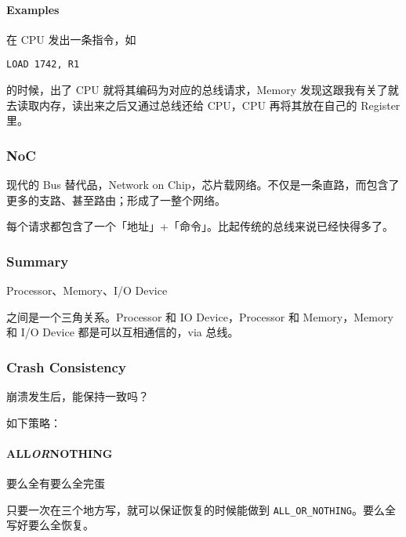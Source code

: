 \documentclass[
]{article}
\begin{document}
\hypertarget{header-n165}{%
\paragraph{Examples}\label{header-n165}}

在 CPU 发出一条指令，如

\begin{verbatim}
LOAD 1742, R1
\end{verbatim}

的时候，出了 CPU 就将其编码为对应的总线请求，Memory
发现这跟我有关了就去读取内存，读出来之后又通过总线还给 CPU，CPU
再将其放在自己的 Register 里。

\hypertarget{header-n169}{%
\subsubsection{NoC}\label{header-n169}}

现代的 Bus 替代品，Network on
Chip，芯片载网络。不仅是一条直路，而包含了更多的支路、甚至路由；形成了一整个网络。

每个请求都包含了一个「地址」+「命令」。比起传统的总线来说已经快得多了。

\hypertarget{header-n172}{%
\subsubsection{Summary}\label{header-n172}}

Processor、Memory、I/O Device

之间是一个三角关系。Processor 和 IO Device，Processor 和 Memory，Memory
和 I/O Device 都是可以互相通信的，via 总线。

\hypertarget{header-n175}{%
\subsubsection{Crash Consistency}\label{header-n175}}

崩溃发生后，能保持一致吗？

如下策略：

\hypertarget{header-n178}{%
\paragraph{\texorpdfstring{ALL\emph{OR}NOTHING}{ALLORNOTHING}}\label{header-n178}}

要么全有要么全完蛋

只要一次在三个地方写，就可以保证恢复的时候能做到
\texttt{ALL\_OR\_NOTHING}。要么全写好要么全恢复。
\end{document}
